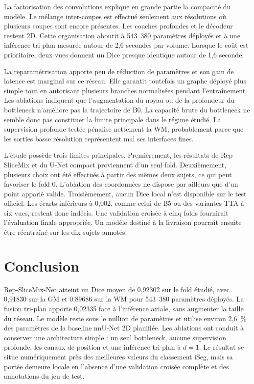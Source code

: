 \documentclass[11pt,a4paper]{article}
\begin{document}
La factorisation des convolutions explique en grande partie la compacité du
modèle. Le mélange inter-coupes est effectué seulement aux résolutions où
plusieurs coupes sont encore présentes. Les couches profondes et le décodeur
restent 2D. Cette organisation aboutit à 543~380 paramètres déployés et à une
inférence tri-plan mesurée autour de 2,6 secondes par volume. Lorsque le coût
est prioritaire, deux vues donnent un Dice presque identique autour de 1,6
seconde.

La reparamétrisation apporte peu de réduction de paramètres et son gain de
latence est marginal sur ce réseau. Elle garantit toutefois un graphe déployé
plus simple tout en autorisant plusieurs branches normalisées pendant
l'entraînement. Les ablations indiquent que l'augmentation du noyau ou de la
profondeur du bottleneck n'améliore pas la trajectoire de B0. La capacité brute
du bottleneck ne semble donc pas constituer la limite principale dans le régime
étudié. La supervision profonde testée pénalise nettement la WM, probablement
parce que les sorties basse résolution représentent mal ses interfaces fines.

L'étude possède trois limites principales. Premièrement, les résultats de
Rep-SliceMix et du U-Net compact proviennent d'un seul fold. Deuxièmement,
plusieurs choix ont été effectués à partir des mêmes deux sujets, ce qui peut
favoriser le fold 0. L'ablation des coordonnées ne dispose par ailleurs que
d'un point apparié valide. Troisièmement, aucun Dice local n'est disponible sur
le test officiel. Les écarts inférieurs à 0,002, comme celui de B5 ou des
variantes TTA à six vues, restent donc indécis. Une validation croisée à cinq
folds fournirait l'évaluation finale appropriée. Un modèle destiné à la
livraison pourrait ensuite être réentraîné sur les dix sujets annotés.

\section{Conclusion}

Rep-SliceMix-Net atteint un Dice moyen de 0,92302 sur le fold étudié, avec
0,91830 sur la GM et 0,89686 sur la WM pour 543~380 paramètres déployés. La
fusion tri-plan apporte 0,02335 face à l'inférence axiale, sans augmenter la
taille du réseau. Le modèle reste sous le million de paramètres et utilise
environ 2,6~\% des paramètres de la baseline nnU-Net 2D planifiée. Les ablations
ont conduit à conserver une architecture simple : un seul bottleneck, aucune
supervision profonde, les canaux de position et une inférence tri-plan à
$d=1$. Le résultat se situe numériquement près des meilleures valeurs du
classement iSeg, mais sa portée demeure locale en l'absence d'une validation
croisée complète et des annotations du jeu de test.
\end{document}

